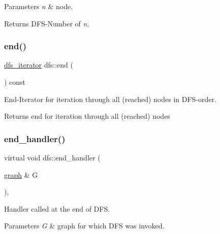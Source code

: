 \begin{DoxyParams}{Parameters}
{\em n} & node. \\
\hline
\end{DoxyParams}
\begin{DoxyReturn}{Returns}
D\+F\+S-\/\+Number of {\itshape n}. 
\end{DoxyReturn}
\mbox{\label{classdfs_af847633fa642258d3522e8deb26aef37}} 
\subsubsection{\texorpdfstring{end()}{end()}}
{\footnotesize\ttfamily \mbox{\hyperlink{classdfs_ad040ddae37492e18c8e029406d667bd9}{dfs\+\_\+iterator}} dfs\+::end (\begin{DoxyParamCaption}{ }\end{DoxyParamCaption}) const\hspace{0.3cm}{\ttfamily [inline]}}



End-\/\+Iterator for iteration through all (reached) nodes in D\+F\+S-\/order. 

\begin{DoxyReturn}{Returns}
end for iteration through all (reached) nodes 
\end{DoxyReturn}
\mbox{\label{classdfs_ab96c7c6183856dd9e356fdcf50835b32}} 
\subsubsection{\texorpdfstring{end\+\_\+handler()}{end\_handler()}}
{\footnotesize\ttfamily virtual void dfs\+::end\+\_\+handler (\begin{DoxyParamCaption}\item[{\mbox{\hyperlink{classgraph}{graph}} \&}]{G }\end{DoxyParamCaption})\hspace{0.3cm}{\ttfamily [inline]}, {\ttfamily [virtual]}}



Handler called at the end of D\+FS. 


\begin{DoxyParams}{Parameters}
{\em G} & graph for which D\+FS was invoked. \\
\hline
\end{DoxyParams}


